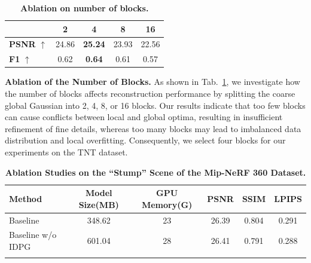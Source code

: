 \begin{table}
    \small
    \vspace{-0.4cm}
    \centering
    \caption{\textbf{Ablation on number of blocks.}} 
    \label{tab5_transposed}
    \renewcommand{\arraystretch}{0.9}
    \setlength{\tabcolsep}{6pt}
    \begin{tabular}{lcccc}
    \toprule[1pt]
    & \textbf{2} & \textbf{4} & \textbf{8} & \textbf{16} \\
    \midrule[0.8pt]
    \textbf{PSNR} $\uparrow$ & 24.86 & \textbf{25.24} & 23.93 & 22.56 \\
    \textbf{F1} $\uparrow$   & 0.62  & \textbf{0.64}  & 0.61  & 0.57  \\
    \bottomrule[1pt]
    \end{tabular}
    \label{tab5}
    \vspace{-0.3cm}
\end{table}


\noindent\textbf{Ablation of the Number of Blocks.}
As shown in Tab.~\ref{tab5}, we investigate how the number of blocks affects reconstruction performance by splitting the coarse global Gaussian into 2, 4, 8, or 16 blocks. Our results indicate that too few blocks can cause conflicts between local and global optima, resulting in insufficient refinement of fine details, whereas too many blocks may lead to imbalanced data distribution and local overfitting. Consequently, we select four blocks for our experiments on the TNT dataset.


\begin{table}[h]
    \centering
    \small
    \caption{\textbf{Ablation Studies on the ``Stump'' Scene of the Mip-NeRF 360 Dataset\cite{Mip-NeRF360}.} }
    \label{tab:6}
    \begin{tabular}{@{}lccccc@{}}
    \toprule
    \textbf{Method} & \textbf{Model Size(MB)} & \textbf{GPU Memory(G)} & \textbf{PSNR} & \textbf{SSIM} & \textbf{LPIPS} \\
    \midrule
    Baseline           & 348.62        &   23  & 26.39 & 0.804 & 0.291 \\
    Baseline w/o IDPG &  601.04    & 28     & 26.41 & 0.791 & 0.288 \\
    \bottomrule
      \label{tab6}
    \end{tabular}
    \vspace{-0.2cm}
\end{table}



